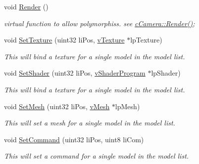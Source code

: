 \begin{DoxyCompactItemize}
void \hyperlink{classc_model_list_a1a956924ef232a2817af62debebb1948}{Render} ()
\begin{DoxyCompactList}\small\item\em virtual function to allow polymorphiss. see \hyperlink{classc_camera_acfe96d0953540fa3938e4d415d7cb791}{cCamera::Render()}; \item\end{DoxyCompactList}\item 
void \hyperlink{classc_model_list_aca5eac521a2bad8078f3fa331d684e60}{SetTexture} (uint32 liPos, \hyperlink{classv_texture}{vTexture} $\ast$lpTexture)
\begin{DoxyCompactList}\small\item\em This will bind a texture for a single model in the model list. \item\end{DoxyCompactList}\item 
void \hyperlink{classc_model_list_a0f3422f0bc87f110a146e3043b223815}{SetShader} (uint32 liPos, \hyperlink{classv_shader_program}{vShaderProgram} $\ast$lpShader)
\begin{DoxyCompactList}\small\item\em This will bind a texture for a single model in the model list. \item\end{DoxyCompactList}\item 
void \hyperlink{classc_model_list_ad09ec9da583c0cac0f529e97f5cd866e}{SetMesh} (uint32 liPos, \hyperlink{classv_mesh}{vMesh} $\ast$lpMesh)
\begin{DoxyCompactList}\small\item\em This will set a mesh for a single model in the model list. \item\end{DoxyCompactList}\item 
void \hyperlink{classc_model_list_af5407cea669c65fe2f9ccd7353aa6944}{SetCommand} (uint32 liPos, uint8 liCom)
\begin{DoxyCompactList}\small\item\em This will set a command for a single model in the model list. \item\end{DoxyCompactList}\end{DoxyCompactItemize}


